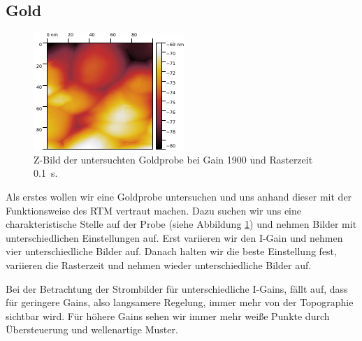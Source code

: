 \subsection{Gold}

\begin{figure}[H]
\centering
\includegraphics[width=\textwidth]{../Gwyddion/Gold/GAIN_opt_Z_forward.pdf}
\caption{Z-Bild der untersuchten Goldprobe bei Gain 1900 und Rasterzeit \SI{0.1}{s}.}
\label{GAIN_opt_Z}
\end{figure}

Als erstes wollen wir eine Goldprobe untersuchen und uns anhand dieser mit der Funktionsweise des RTM vertraut machen. Dazu suchen wir uns eine charakteristische Stelle auf der Probe (siehe Abbildung \ref{GAIN_opt_Z}) und nehmen Bilder mit unterschiedlichen Einstellungen auf. Erst variieren wir den I-Gain und nehmen vier unterschiedliche Bilder auf. Danach halten wir die beste Einstellung fest, variieren die Rasterzeit und nehmen wieder unterschiedliche Bilder auf.

Bei der Betrachtung der Strombilder für unterschiedliche I-Gains, fällt auf, dass für geringere Gains, also langsamere Regelung, immer mehr von der Topographie sichtbar wird. Für höhere Gains sehen wir immer mehr weiße Punkte durch Übersteuerung und wellenartige Muster.

